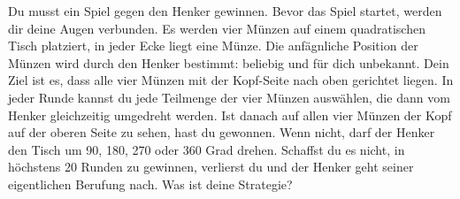 \documentclass{uebung_cs}
\begin{document}
\begin{aufgabe}
    Du musst ein Spiel gegen den Henker gewinnen. Bevor das Spiel startet, werden dir deine Augen verbunden. Es werden vier Münzen auf einem quadratischen Tisch platziert, in jeder Ecke liegt eine Münze. Die anfägnliche Position der Münzen wird durch den Henker bestimmt: beliebig und für dich unbekannt. Dein Ziel ist es, dass alle vier Münzen mit der Kopf-Seite nach oben gerichtet liegen. In jeder Runde kannst du jede Teilmenge der vier Münzen auswählen, die dann vom Henker gleichzeitig umgedreht werden. Ist danach auf allen vier Münzen der Kopf auf der oberen Seite zu sehen, hast du gewonnen. Wenn nicht, darf der Henker den Tisch um 90, 180, 270 oder 360 Grad drehen. Schaffst du es nicht, in höchstens 20 Runden zu gewinnen, verlierst du und der Henker geht seiner eigentlichen Berufung nach. Was ist deine Strategie?
\end{aufgabe}
\end{document}
